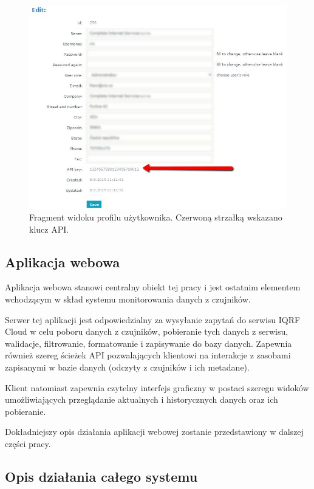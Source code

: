 \documentclass[a4paper, 12pt]{article}
\begin{document}
\begin{figure}[H]
    \includegraphics[width=\textwidth]{zdj/api-key.png}
    \caption{Fragment widoku profilu użytkownika. Czerwoną strzałką wskazano klucz API.}
\end{figure}

\subsection{Aplikacja webowa}

Aplikacja webowa stanowi centralny obiekt tej pracy i jest ostatnim elementem wchodzącym w skład systemu monitorowania danych
z czujników. 

Serwer tej aplikacji jest odpowiedzialny za wysyłanie zapytań do serwisu IQRF Cloud w celu poboru danych z czujników, pobieranie
tych danych z serwisu, walidacje, filtrowanie, formatowanie i zapisywanie do bazy danych. Zapewnia również szereg ścieżek API pozwalających
klientowi na interakcje z zasobami zapisanymi w bazie danych (odczyty z czujników i ich metadane).

Klient natomiast zapewnia czytelny interfejs graficzny w postaci szeregu widoków umożliwiających przeglądanie aktualnych i 
historycznych danych oraz ich pobieranie.

Dokładniejszy opis działania aplikacji webowej zostanie przedstawiony w dalszej części pracy.

\subsection{Opis działania całego systemu}
\end{document}
